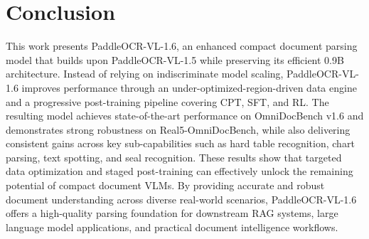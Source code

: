 \documentclass[11pt, a4paper,logo,  copyright, nonumbering]{paddleocr}
\begin{document}
\section{Conclusion}

This work presents PaddleOCR-VL-1.6, an enhanced compact document parsing model that builds upon PaddleOCR-VL-1.5 while preserving its efficient 0.9B architecture. Instead of relying on indiscriminate model scaling, PaddleOCR-VL-1.6 improves performance through an under-optimized-region-driven data engine and a progressive post-training pipeline covering CPT, SFT, and RL. The resulting model achieves state-of-the-art performance on OmniDocBench v1.6 and demonstrates strong robustness on Real5-OmniDocBench, while also delivering consistent gains across key sub-capabilities such as hard table recognition, chart parsing, text spotting, and seal recognition. These results show that targeted data optimization and staged post-training can effectively unlock the remaining potential of compact document VLMs. By providing accurate and robust document understanding across diverse real-world scenarios, PaddleOCR-VL-1.6 offers a high-quality parsing foundation for downstream RAG systems, large language model applications, and practical document intelligence workflows.

% 




\setcounter{figure}{0}
\makeatletter 
\renewcommand{\thefigure}{A\@arabic\c@figure}
\makeatother

\setcounter{table}{0}
\makeatletter 
\renewcommand{\thetable}{A\@arabic\c@table}
\makeatother
\end{document}
